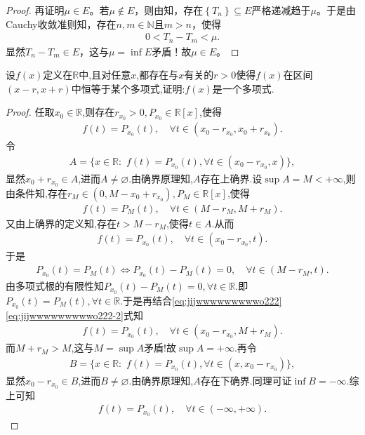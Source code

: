 \documentclass[../../main.tex]{subfiles}%
\begin{document}
\begin{proof}
再证明$\mu \in E$。若$\mu \notin E$，则由知，存在$\left\{ T_n \right\} \subseteq E$严格递减趋于$\mu$。于是由Cauchy收敛准则知，存在$n,m\in \mathbb{N}$且$m>n$，使得
\begin{align*}
0<T_n-T_m<\mu .
\end{align*}
显然$T_n-T_m\in E$，这与$\mu =\inf\limits_{}E$矛盾！故$\mu \in E$。
\end{proof}

\begin{example}
设$f(x)$定义在$\mathbb{R}$中,且对任意$x$,都存在与$x$有关的$r>0$使得$f(x)$在区间$(x-r,x+r)$中恒等于某个多项式,证明:$f(x)$是一个多项式.
\end{example}
\begin{proof}
任取$x_0\in \mathbb{R}$,则存在$r_{x_0}>0,P_{x_0}\in \mathbb{R}[x]$,使得
\begin{align*}
f(t)=P_{x_0}(t),\quad \forall t\in (x_0-r_{x_0},x_0+r_{x_0}).
\end{align*}
令
\begin{align*}
A=\{x\in \mathbb{R}:\,\,f(t)=P_{x_0}(t),\forall t\in (x_0-r_{x_0},x)\},
\end{align*}
显然$x_0+r_{x_0}\in A$,进而$A\ne \varnothing$.由确界原理知,$A$存在上确界.设$\sup A=M<+\infty$,则由条件知,存在$r_M\in (0,M-x_0+r_{x_0}),P_M\in \mathbb{R}[x]$,使得
\begin{align}\label{eq:jijwwwwwwwwwo222}
f(t)=P_M(t),\quad \forall t\in (M-r_M,M+r_M).
\end{align}
又由上确界的定义知,存在$t>M-r_M$,使得$t\in A$.从而
\begin{align}\label{eq:jijwwwwwwwwwo222-2}
f(t)=P_{x_0}(t),\quad \forall t\in (x_0-r_{x_0},t).
\end{align}
于是
\begin{align*}
P_{x_0}(t)=P_M(t)\Longleftrightarrow P_{x_0}(t)-P_M(t)=0,\quad \forall t\in (M-r_M,t).
\end{align*}
由多项式根的有限性知$P_{x_0}(t)-P_M(t)=0,\forall t\in \mathbb{R}$.即$P_{x_0}(t)=P_M(t),\forall t\in \mathbb{R}$.于是再结合\eqref{eq:jijwwwwwwwwwo222}\eqref{eq:jijwwwwwwwwwo222-2}式知
\begin{align*}
f(t)=P_{x_0}(t),\quad \forall t\in (x_0-r_{x_0},M+r_M).
\end{align*}
而$M+r_M>M$,这与$M=\sup A$矛盾!故$\sup A=+\infty$.再令
\begin{align*}
B=\{x\in \mathbb{R}:\,\,f(t)=P_{x_0}(t),\forall t\in (x,x_0-r_{x_0})\},
\end{align*}
显然$x_0-r_{x_0}\in B$,进而$B\ne \varnothing$.由确界原理知,$A$存在下确界.同理可证$\inf B=-\infty$.综上可知
\begin{align*}
f(t)=P_{x_0}(t),\quad \forall t\in (-\infty,+\infty).
\end{align*}
\end{proof}
\end{document}
